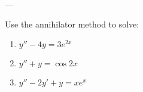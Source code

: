 ---

\begin{question}
Use the annihilator method to solve:
\begin{enumerate}
    \item $y''-4y=3e^{2x}$
    \item $y''+y=\cos 2x$
    \item $y''-2y'+y = x e^x$
\end{enumerate}
\end{question}





%





